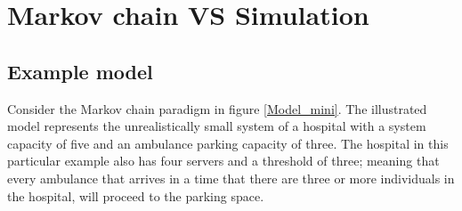 \section{Markov chain VS Simulation}

\subsection{Example model}
Consider the Markov chain paradigm in figure \ref{Model_mini}. The illustrated model represents the unrealistically small system of a hospital with a system capacity of five and an ambulance parking capacity of three. The hospital in this particular example also has four servers and a threshold of three; meaning that every ambulance that arrives in a time that there are three or more individuals in the hospital, will proceed to the parking space.

